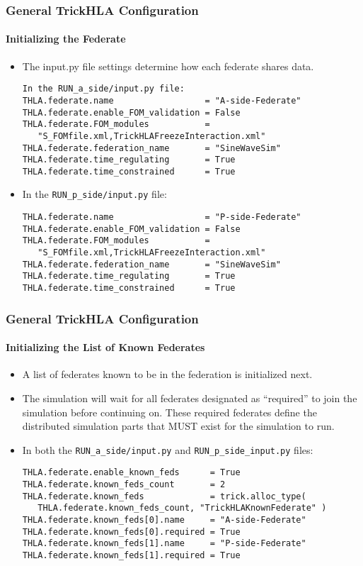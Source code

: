    \begin{frame}[fragile]
      \frametitle{General TrickHLA Configuration}
      \framesubtitle{Initializing the Federate}
      \begin{itemize}
         \item The input.py file settings determine how each federate shares data.
\begin{Verbatim}[frame=single, fontsize=\footnotesize]
In the RUN_a_side/input.py file:
THLA.federate.name                  = "A-side-Federate"
THLA.federate.enable_FOM_validation = False
THLA.federate.FOM_modules           = 
   "S_FOMfile.xml,TrickHLAFreezeInteraction.xml"
THLA.federate.federation_name       = "SineWaveSim"
THLA.federate.time_regulating       = True
THLA.federate.time_constrained      = True
\end{Verbatim}
         \item In the \texttt{RUN\_p\_side/input.py} file:
\begin{Verbatim}[frame=single, fontsize=\footnotesize]
THLA.federate.name                  = "P-side-Federate"
THLA.federate.enable_FOM_validation = False
THLA.federate.FOM_modules           = 
   "S_FOMfile.xml,TrickHLAFreezeInteraction.xml"
THLA.federate.federation_name       = "SineWaveSim"
THLA.federate.time_regulating       = True
THLA.federate.time_constrained      = True
\end{Verbatim}
      \end{itemize}
   \end{frame}
   
   \begin{frame}[fragile]
      \frametitle{General TrickHLA Configuration}
      \framesubtitle{Initializing the List of Known Federates}
      \begin{itemize}
         \item A list of federates known to be in the federation is initialized next.
         \item The simulation will wait for all federates designated as “required”
         to join the simulation before continuing on. These required federates
         define the distributed simulation parts that MUST exist for the
         simulation to run.
         \item In both the \texttt{RUN\_a\_side/input.py} and \texttt{RUN\_p\_side\_input.py} files:
\begin{Verbatim}[frame=single, fontsize=\footnotesize]
THLA.federate.enable_known_feds      = True
THLA.federate.known_feds_count       = 2
THLA.federate.known_feds             = trick.alloc_type(
   THLA.federate.known_feds_count, "TrickHLAKnownFederate" )
THLA.federate.known_feds[0].name     = "A-side-Federate"
THLA.federate.known_feds[0].required = True
THLA.federate.known_feds[1].name     = "P-side-Federate"
THLA.federate.known_feds[1].required = True
\end{Verbatim}
      \end{itemize}
   \end{frame}
   
